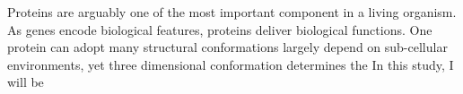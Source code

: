 Proteins are arguably one of the most important component in a living organism. As genes encode biological features, proteins deliver biological functions. One protein can adopt many structural conformations largely depend on sub-cellular environments, yet three dimensional conformation determines the     In this study, I will be 